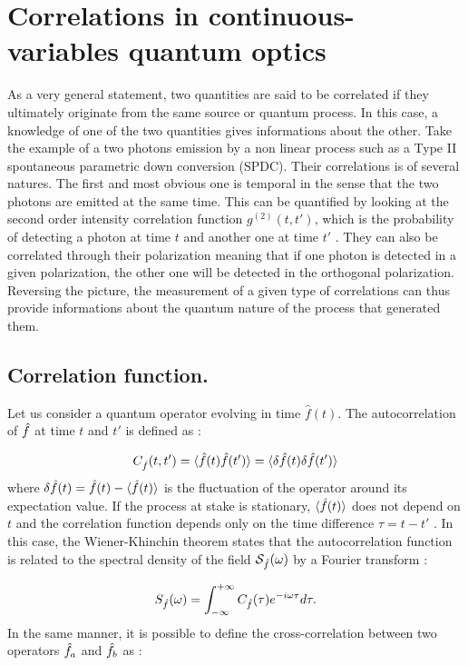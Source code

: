 \section{Correlations in continuous-variables quantum optics}

\label{sec:corr_cv}
As a very general statement, two quantities are said to be correlated if they ultimately originate from the same source or quantum process. In this case, a knowledge of one of the two quantities gives informations about the other.
Take the example of a two photons emission by a non linear process such as a Type II spontaneous parametric down conversion (SPDC). Their correlations is of several natures. The first and most obvious one is temporal in the sense that the two photons are emitted at the same time. This can be
quantified by looking at the second order intensity correlation function $g^{(2)}(t,t')$, which is the probability of detecting a photon at time $t$ and another one at time $t'$ \cite{hanbury_brown_twiss_1956}. They can also 
be correlated through their polarization meaning that if one photon is detected in a given polarization, the other one will be detected in the orthogonal polarization. Reversing the picture,
the measurement of a given type of correlations can thus provide informations about the quantum nature of the process that generated them.

\subsection{Correlation function.} Let us consider a quantum operator evolving in time $\hat{f}(t)$. The autocorrelation of $\hat{f}$ at time $t$ and $t'$ is defined as :


\begin{equation}
    \label{eq:autocorr}
    C_{\hat{f}}(t,t') = \langle \hat{f}(t)\hat{f}(t') \rangle = \langle \delta \hat{f}(t) \delta \hat{f}(t') \rangle
\end{equation}
where $\delta \hat{f}(t) = \hat{f}(t) - \langle \hat{f}(t) \rangle$ is the fluctuation of the operator around its expectation value. If the process at stake 
is stationary, $\langle \hat{f}(t) \rangle$ does not depend on $t$ and the correlation function depends only on the time difference $\tau= t-t'$ \cite{bachor_guide_1998}. In this case,
the Wiener-Khinchin theorem states that the autocorrelation function is related to the spectral density of the field $\mathcal{S}_{\hat{f}}(\omega)$ by a Fourier transform \cite{fabre_houches_97} :

\begin{equation}
    \label{eq:autocorr_spectral}
    S_{\hat{f}}(\omega) = \int_{-\infty}^{+\infty} C_{\hat{f}}(\tau) e^{-i\omega \tau} d\tau.
\end{equation}
In the same manner, it is possible to define the cross-correlation between two operators $\hat{f}_a$ and $\hat{f}_b$ as :

